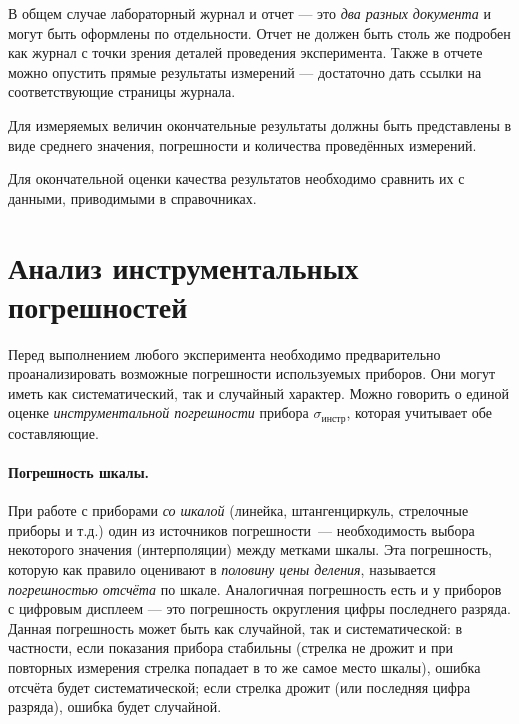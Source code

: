В общем случае лабораторный журнал и отчет --- это \emph{два разных документа} и
могут быть оформлены по отдельности. Отчет не должен быть столь же подробен
как журнал с точки зрения деталей проведения эксперимента.
Также в отчете можно опустить прямые результаты измерений ---
достаточно дать ссылки на соответствующие страницы журнала.

Для измеряемых величин окончательные результаты должны быть представлены
в виде среднего значения, погрешности и количества проведённых измерений.

Для окончательной оценки качества результатов необходимо
сравнить их с данными, приводимыми в справочниках.


\section{Анализ инструментальных погрешностей}

Перед выполнением любого эксперимента необходимо предварительно проанализировать
возможные погрешности используемых приборов. Они могут
иметь как систематический, так и случайный характер. Можно говорить
о единой оценке \emph{инструментальной погрешности} прибора
$\sigma_{\text{инстр}}$, которая учитывает обе составляющие.

\paragraph{Погрешность шкалы.}
При работе с приборами \emph{со шкалой} (линейка, штангенциркуль, стрелочные
приборы и т.д.) один из источников погрешности~--- необходимость
выбора некоторого значения (интерполяции) между метками шкалы. Эта
погрешность, которую как правило оценивают в \emph{половину цены деления},
называется \emph{погрешностью отсчёта} по шкале. Аналогичная погрешность
есть и у приборов с цифровым дисплеем --- это погрешность
округления цифры последнего разряда. Данная погрешность может быть
как случайной, так и систематической: в частности, если показания
прибора стабильны (стрелка не дрожит и при повторных измерения стрелка
попадает в то же самое место шкалы), ошибка отсчёта будет систематической;
если стрелка дрожит (или  последняя цифра разряда),
ошибка будет случайной.

